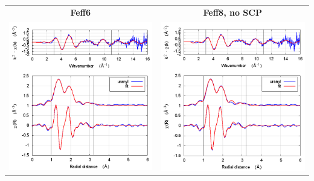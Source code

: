 \documentclass[11pt]{article}
\begin{document}
\begin{center}
  \begin{tabular}{cc}
    \textbf{Feff6} & \textbf{Feff8, no SCP} \\ 
    \includegraphics[width=.45\linewidth]{uranyl/scf/fit_feff6.png} &
    \includegraphics[width=.45\linewidth]{uranyl/scf/fit_noSCF.png} \\
  \end{tabular}
\end{center}
\end{document}
